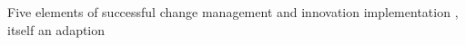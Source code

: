 \label{fig:implementation} Five elements of successful change management and innovation implementation \cite{ADEC2016}, itself an adaption \cite{Thousand2001}